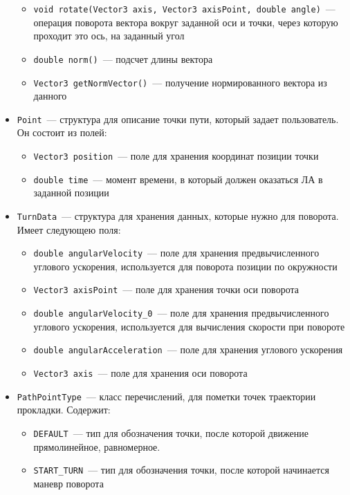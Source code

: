 \documentclass[a4paper,12pt]{article}
\begin{document}
\begin{itemize}
\begin{itemize}
        \item \texttt{void rotate(Vector3 axis, Vector3 axisPoint, double angle)}~--- операция поворота вектора вокруг заданной оси и точки, через которую проходит это ось, на заданный угол
        \item \texttt{double norm()}~--- подсчет длины вектора
        \item \texttt{Vector3 getNormVector()}~--- получение нормированного вектора из данного
    \end{itemize}
    \item \texttt{Point}~--- структура для описание точки пути, который задает пользователь. Он состоит из полей:
    \begin{itemize}
        \item \texttt{Vector3 position}~--- поле для хранения координат позиции точки
        \item \texttt{double time}~--- момент времени, в который должен оказаться ЛА в заданной позиции
    \end{itemize}
    \item \texttt{TurnData}~--- структура для хранения данных, которые нужно для поворота. Имеет следующею поля:
    \begin{itemize}
        \item \texttt{double angularVelocity}~--- поле для хранения предвычисленного углового ускорения, используется для поворота позиции по окружности
        \item \texttt{Vector3 axisPoint}~--- поле для хранения точки оси поворота
        \item \texttt{double angularVelocity\_0}~--- поле для хранения предвычисленного углового ускорения, используется для вычисления скорости при повороте
        \item \texttt{double angularAcceleration}~--- поле для хранения углового ускорения
        \item \texttt{Vector3 axis}~--- поле для хранения оси поворота
    \end{itemize}
    \item \texttt{PathPointType}~--- класс перечислений, для пометки точек траектории прокладки. Содержит:
        \begin{itemize}
            \item \texttt{DEFAULT}~--- тип для обозначения точки, после которой движение прямолинейное, равномерное.
            \item \texttt{START\_TURN}~--- тип для обозначения точки, после которой начинается маневр поворота 

\end{itemize}
\end{itemize}
\end{document}
